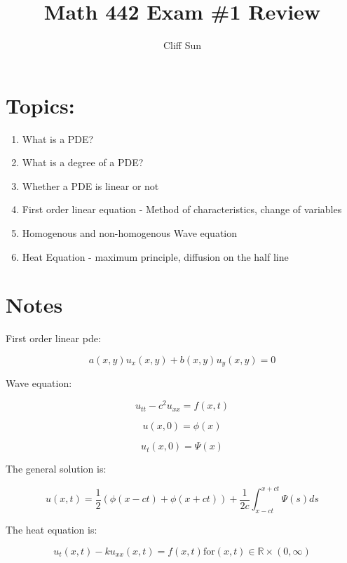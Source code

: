 \documentclass{article}
\title{Math 442 Exam \#1 Review}
\author{Cliff Sun}
\begin{document}
\maketitle
\section*{Topics:}
\begin{enumerate}
    \item What is a PDE?
    \item What is a degree of a PDE?
    \item Whether a PDE is linear or not
    \item First order linear equation - Method of characteristics, change of variables
    \item Homogenous and non-homogenous Wave equation 
    \item Heat Equation - maximum principle, diffusion on the half line
\end{enumerate}

\section*{Notes}

First order linear pde:

\begin{equation}
    a(x,y)u_{x}(x,y) + b(x,y)u_{y}(x,y) = 0
\end{equation}

Wave equation:

\begin{equation}
    u_{tt} - c^2u_{xx} = f(x,t)
\end{equation}

\begin{equation}
    u(x,0) = \phi(x)
\end{equation}

\begin{equation}
    u_t(x,0) = \Psi(x)
\end{equation}

The general solution is:

\begin{equation}
    u(x,t) = \frac{1}{2}(\phi(x - ct) + \phi(x + ct)) + \frac{1}{2c}\int_{x-ct}^{x+ct}\Psi(s)ds
\end{equation}

The heat equation is:

\begin{equation}
    u_t(x,t) - ku_{xx}(x,t) = f(x,t) \textrm{for} (x,t) \in \mathbb{R} \times (0,\infty)
\end{equation}
\end{document}
